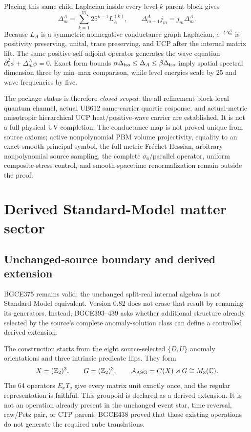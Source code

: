 \documentclass[11pt]{article}
\theoremstyle{definition}
\theoremstyle{remark}
\begin{document}
Placing this same child Laplacian inside every level-$k$ parent block gives
\begin{equation}
 \Delta_m^A=\sum_{k=1}^{m}25^{k-1}L_A^{(k)},
 \qquad
 \Delta_{m+1}^Aj_m=j_m\Delta_m^A.
\end{equation}
Because $L_A$ is a symmetric nonnegative-conductance graph Laplacian, $e^{-t\Delta_m^A}$ is positivity preserving, unital, trace preserving, and UCP after the internal matrix lift. The same positive self-adjoint operator generates the wave equation $\partial_s^2\phi+\Delta_m^A\phi=0$. Exact form bounds $\alpha\Delta_{\rm iso}\le\Delta_A\le\beta\Delta_{\rm iso}$ imply spatial spectral dimension three by min--max comparison, while level energies scale by 25 and wave frequencies by five.

The package status is therefore \emph{closed scoped}: the all-refinement block-local quantum channel, actual UB612 same-carrier quartic response, and actual-metric anisotropic hierarchical UCP heat/positive-wave carrier are established. It is not a full physical UV completion. The conductance map is not proved unique from source axioms; active nonpolynomial PBM volume projectivity, equality to an exact smooth principal symbol, the full metric Fr\'echet Hessian, arbitrary nonpolynomial source sampling, the complete $\sigma_6$/parallel operator, uniform composite-stress control, and smooth-spacetime renormalization remain outside the proof.

\section{Derived Standard-Model matter sector}\label{sec:sm082}

\subsection{Unchanged-source boundary and derived extension}

BGCE375 remains valid: the unchanged split-real internal algebra is not Standard-Model equivalent. Version 0.82 does not erase that result by renaming its generators. Instead, BGCE393--439 asks whether additional structure already selected by the source's complete anomaly-solution class can define a controlled derived extension.

The construction starts from the eight source-selected $\{D,U\}$ anomaly orientations and three intrinsic predicate flips. They form
\begin{equation}
 X=(\mathbb Z_2)^3,
 \qquad
 G=(\mathbb Z_2)^3,
 \qquad
 \mathcal A_{\rm ASG}=C(X)\rtimes G\cong M_8(\mathbb C).
\end{equation}
The 64 operators $E_xT_g$ give every matrix unit exactly once, and the regular representation is faithful. This groupoid is declared as a derived extension. It is not an operation already present in the unchanged event star, time reversal, raw/Petz pair, or CTP parent; BGCE438 proved that those existing operations do not generate the required cube translations.
\end{document}
